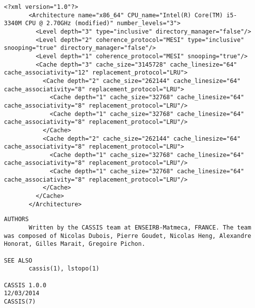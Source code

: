 \begin{lstlisting}[style=styleXml]
       <?xml version="1.0"?>
       <Architecture name="x86_64" CPU_name="Intel(R) Core(TM) i5-3340M CPU @ 2.70GHz (modified)" number_levels="3">
         <Level depth="3" type="inclusive" directory_manager="false"/>
         <Level depth="2" coherence_protocol="MESI" type="inclusive" snooping="true" directory_manager="false"/>
         <Level depth="1" coherence_protocol="MESI" snooping="true"/>
         <Cache depth="3" cache_size="3145728" cache_linesize="64" cache_associativity="12" replacement_protocol="LRU">
           <Cache depth="2" cache_size="262144" cache_linesize="64" cache_associativity="8" replacement_protocol="LRU">
             <Cache depth="1" cache_size="32768" cache_linesize="64" cache_associativity="8" replacement_protocol="LRU"/>
             <Cache depth="1" cache_size="32768" cache_linesize="64" cache_associativity="8" replacement_protocol="LRU"/>
           </Cache>
           <Cache depth="2" cache_size="262144" cache_linesize="64" cache_associativity="8" replacement_protocol="LRU">
             <Cache depth="1" cache_size="32768" cache_linesize="64" cache_associativity="8" replacement_protocol="LRU"/>
             <Cache depth="1" cache_size="32768" cache_linesize="64" cache_associativity="8" replacement_protocol="LRU"/>
           </Cache>
         </Cache>
       </Architecture>
\end{lstlisting}
\begin{lstlisting}[style=styleMan]
AUTHORS
       Written by the CASSIS team at ENSEIRB-Matmeca, FRANCE. The team was composed of Nicolas Dubois, Pierre Goudet, Nicolas Heng, Alexandre Honorat, Gilles Marait, Gregoire Pichon.

SEE ALSO
       cassis(1), lstopo(1)

CASSIS 1.0.0                                                                                                  12/03/2014                                                                                                     CASSIS(7)
\end{lstlisting}

